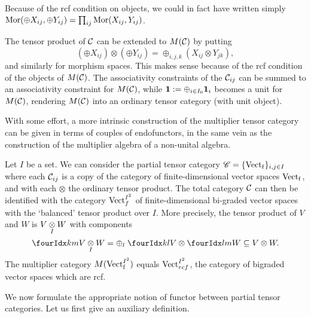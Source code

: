 \begin{Rem} Because of the rcf condition on objects, we could in fact have written simply $\mathrm{Mor}(\oplus X_{ij},\oplus Y_{ij}) = \prod_{ij} \mathrm{Mor}(X_{ij},Y_{ij})$. 
\end{Rem} 

The tensor product of $\mathcal{C}$ can be extended to $M(\mathcal{C})$ by putting \[\left(\oplus X_{ij}\right)\otimes \left(\oplus Y_{ij}\right) = \oplus_{i,j,k} \left(X_{ij}\otimes Y_{jk}\right),\] and similarly for morphism spaces. This makes sense because of the rcf condition of the objects of $M(\mathcal{C})$. The associativity constraints of the $\mathcal{C}_{ij}$ can be summed to an associativity constraint for $M(\mathcal{C})$, while $\mathbf{1} := \oplus_{i\in I_0} \mathbf{1}_i$ becomes a unit for $M(\mathcal{C})$, rendering $M(\mathcal{C})$ into an ordinary tensor category (with unit object).

\begin{Rem} With some effort, a more intrinsic construction of the multiplier tensor category can be given in terms of couples of endofunctors, in the same vein as the construction of the multiplier algebra of a non-unital algebra.
\end{Rem} 

\begin{Exa}\label{ExaVectBiGr} Let $I$ be a set. We can consider the partial tensor category $\mathscr{C} = \{\mathrm{Vect}_{\operatorname{\mathrm{f}}}\}_{i,j\in I}$ where each $\mathcal{C}_{ij}$ is a copy of the category of finite-dimensional vector spaces $\mathrm{Vect}_{\operatorname{\mathrm{f}}}$, and with each $\otimes$ the ordinary tensor product. The total category $\mathcal{C}$ can then be identified with the category $\mathrm{Vect}_{f}^{I^{2}}$ of finite-dimensional bi-graded vector spaces with the `balanced' tensor product over $I$. More precisely, the tensor product of $V$ and $W$ is $V\underset{I}{\otimes} W$ with components \[\Gru{V\itimes W}{k}{m} = \oplus_l \;\Gru{V}{k}{l}\otimes \Gru{W}{l}{m}\subseteq V\otimes W.\] The multiplier category $M(\mathrm{Vect}^{I^2}_{\operatorname{\mathrm{f}}})$ equals $\mathrm{Vect}_{rcf}^{I^{2}}$, the category of bigraded vector spaces which are rcf.
\end{Exa}

We now formulate the appropriate notion of functor between partial tensor categories. Let us first give an auxiliary definition.

